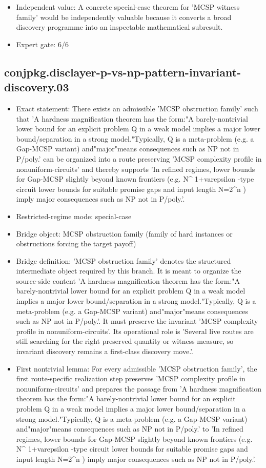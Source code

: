 \documentclass[11pt]{article}
\begin{document}
\begin{itemize}
\item Independent value: A concrete special-case theorem for 'MCSP witness family' would be independently valuable because it converts a broad discovery programme into an inspectable mathematical subresult.
\item Expert gate: 6/6
\end{itemize}

\subsection*{conjpkg.disclayer-p-vs-np-pattern-invariant-discovery.03}
\begin{itemize}
\item Exact statement: There exists an admissible 'MCSP obstruction family' such that 'A hardness magnification theorem has the form:"A barely-nontrivial lower bound for an explicit problem Q in a weak model implies a major lower bound/separation in a strong model."Typically, Q is a meta-problem (e.g. a Gap-MCSP variant) and"major"means consequences such as NP not in P/poly.' can be organized into a route preserving 'MCSP complexity profile in nonuniform-circuits' and thereby supports 'In refined regimes, lower bounds for Gap-MCSP slightly beyond known frontiers (e.g. N\textasciicircum{} 1+varepsilon -type circuit lower bounds for suitable promise gaps and input length N=2\textasciicircum{}n ) imply major consequences such as NP not in P/poly.'.
\item Restricted-regime mode: special-case
\item Bridge object: MCSP obstruction family (family of hard instances or obstructions forcing the target payoff)
\item Bridge definition: 'MCSP obstruction family' denotes the structured intermediate object required by this branch. It is meant to organize the source-side content 'A hardness magnification theorem has the form:"A barely-nontrivial lower bound for an explicit problem Q in a weak model implies a major lower bound/separation in a strong model."Typically, Q is a meta-problem (e.g. a Gap-MCSP variant) and"major"means consequences such as NP not in P/poly.'. It must preserve the invariant 'MCSP complexity profile in nonuniform-circuits'. Its operational role is 'Several live routes are still searching for the right preserved quantity or witness measure, so invariant discovery remains a first-class discovery move.'.
\item First nontrivial lemma: For every admissible 'MCSP obstruction family', the first route-specific realization step preserves 'MCSP complexity profile in nonuniform-circuits' and prepares the passage from 'A hardness magnification theorem has the form:"A barely-nontrivial lower bound for an explicit problem Q in a weak model implies a major lower bound/separation in a strong model."Typically, Q is a meta-problem (e.g. a Gap-MCSP variant) and"major"means consequences such as NP not in P/poly.' to 'In refined regimes, lower bounds for Gap-MCSP slightly beyond known frontiers (e.g. N\textasciicircum{} 1+varepsilon -type circuit lower bounds for suitable promise gaps and input length N=2\textasciicircum{}n ) imply major consequences such as NP not in P/poly.'.

\end{itemize}
\end{document}

